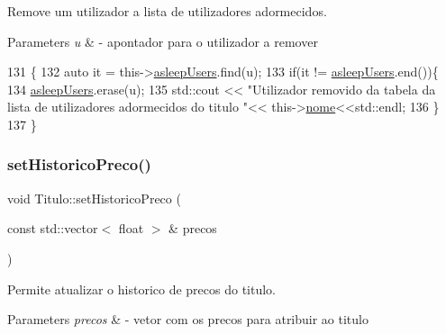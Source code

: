 Remove um utilizador a lista de utilizadores adormecidos. 


\begin{DoxyParams}{Parameters}
{\em u} & -\/ apontador para o utilizador a remover \\
\hline
\end{DoxyParams}

\begin{DoxyCode}
131                                              \{
132     \textcolor{keyword}{auto} it = this->\hyperlink{classTitulo_a84e7b9dc58fbba5f048a57a0878a43e8}{asleepUsers}.find(u);
133     \textcolor{keywordflow}{if}(it != \hyperlink{classTitulo_a84e7b9dc58fbba5f048a57a0878a43e8}{asleepUsers}.end())\{
134         \hyperlink{classTitulo_a84e7b9dc58fbba5f048a57a0878a43e8}{asleepUsers}.erase(u);
135         std::cout << \textcolor{stringliteral}{"Utilizador removido da tabela da lista de utilizadores adormecidos do titulo "}<<
      this->\hyperlink{classTitulo_a8abdf1fc6d4fc14be20bbec247664d83}{nome}<<std::endl;
136     \}
137 \}
\end{DoxyCode}
\mbox{\label{classTitulo_a8ea091928732a5ff5b974e003668a778}} 
\subsubsection{\texorpdfstring{set\+Historico\+Preco()}{setHistoricoPreco()}}
{\footnotesize\ttfamily void Titulo\+::set\+Historico\+Preco (\begin{DoxyParamCaption}\item[{const std\+::vector$<$ float $>$ \&}]{precos }\end{DoxyParamCaption})}



Permite atualizar o historico de precos do titulo. 


\begin{DoxyParams}{Parameters}
{\em precos} & -\/ vetor com os precos para atribuir ao titulo \\
\hline
\end{DoxyParams}

